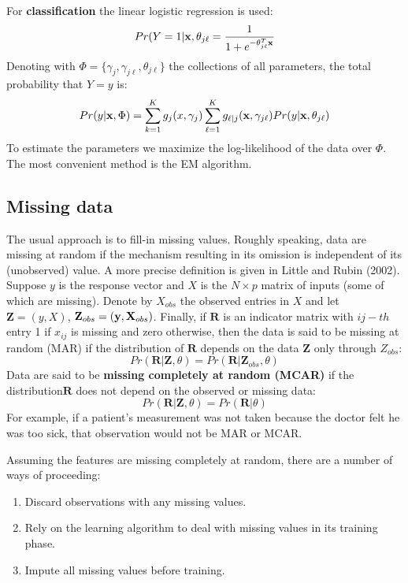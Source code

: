 For \textbf{classification} the linear logistic regression is used:
\begin{equation}
Pr(Y=1|\mathbf{x}, \theta_{j\ell} = \frac{1}{1+e^{-\theta_{j\ell}^T\mathbf{x}}}
\end{equation}
Denoting with $\Phi = \{\gamma_j,\gamma_{j\ell}, \theta_{j\ell}\}$ the collections of all parameters, the total probability that $Y=y$ is:
\begin{equation}
Pr(y|\mathbf{x}, \Phi) = \sum_{k=1}^K g_j(x, \gamma_j)\sum_{\ell=1}^K g_{\ell|j}(\mathbf{x}, \gamma_{j\ell})Pr(y|\mathbf{x},\theta_{j\ell})
\end{equation}
To estimate the parameters we maximize the log-likelihood of the data over $\Phi$. The most convenient method is the EM algorithm.

\subsection{Missing data}
The usual approach is to fill-in missing values. Roughly speaking, data are missing at random if the mechanism resulting in its omission is independent of its (unobserved) value. A more precise definition is given in Little and Rubin (2002). Suppose $y$ is the response vector and $X$ is the $N \times p$ matrix of inputs (some of which are missing). Denote by $X_{obs}$ the observed entries in $X$ and let $\mathbf{Z} = (y, X)$, $\mathbf{Z}_{obs} = (\mathbf{y}, \mathrm{\mathbf{X}}_{obs})$. Finally, if $\mathbf{R}$ is an indicator matrix with $ij-th$entry 1 if $x_{ij}$ is missing and zero otherwise, then the data is said to be missing at random (MAR) if the distribution of $\mathbf{R}$ depends on the data $\mathbf{Z}$ only through $Z_{obs}$:
\begin{equation}
Pr(\mathbf{R}|\mathbf{Z},\theta) = Pr (\mathbf{R}|\mathbf{Z}_{obs},\theta)
\end{equation}
Data are said to be \textbf{missing completely at random (MCAR)} if the distribution$\mathbf{R}$ does not depend on the observed or missing data:
\begin{equation}
Pr(\mathbf{R}|\mathbf{Z},\theta) = Pr (\mathbf{R}|\theta)
\end{equation}
For example, if a patient’s measurement was not taken because the doctor felt he was too sick, that observation would not be MAR or MCAR.

Assuming the features are missing completely at random, there are a number of ways of proceeding:

\begin{enumerate}
\item \label{Missingi}Discard observations with any missing values.
\item \label{Missingii}Rely on the learning algorithm to deal with missing values in its training phase.
\item \label{Missingiii}Impute all missing values before training.
\end{enumerate}

